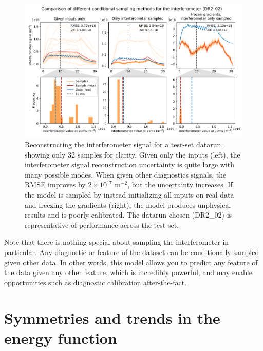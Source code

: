 \begin{figure}
	\centering
	\includegraphics[width=\linewidth]{figures/interferometer_sampling_comp_39-0.pdf}
	\caption[Interferometer time series reconstruction]{\label{fig:ifo_sample}Reconstructing the interferometer signal for a test-set datarun, showing only 32 samples for clarity. Given only the inputs (left), the interferometer signal reconstruction uncertainty is quite large with many possible modes. When given other diagnostics signals, the RMSE improves by $2 \times 10^{17}$ m$^{-2}$, but the uncertainty increases. If the model is sampled by instead initializing all inputs on real data and freezing the gradients (right), the model produces unphysical results and is poorly calibrated. The datarun chosen (DR2\_02) is representative of performance across the test set. }
\end{figure}

Note that there is nothing special about sampling the interferometer in particular. Any diagnostic or feature of the dataset can be conditionally sampled given other data. In other words, this model allows you to predict any feature of the data given any other feature, which is incredibly powerful, and may enable opportunities such as diagnostic calibration after-the-fact.

\section{Symmetries and trends in the energy function}

